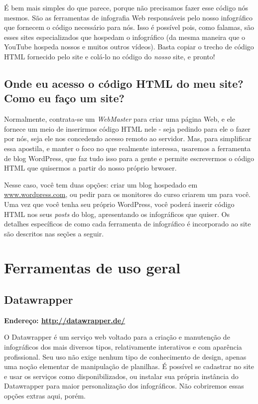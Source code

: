 \documentclass[12pt,onecolumn]{article}
\begin{document}
    É bem mais simples do que parece, porque não precisamos fazer esse código
    nós mesmos. São as ferramentas de infografia Web responsáveis pelo nosso
    infográfico que fornecem o código necessário para nós. Isso é possível pois,
    como falamas, são esses sites especializados que hospedam o infográfico (da
    mesma maneira que o YouTube hospeda nossos e muitos outros vídeos). Basta
    copiar o trecho de código HTML fornecido pelo site e colá-lo no código do 
    \emph{nosso} site, e pronto!
    
  \subsection{Onde eu acesso o código HTML do meu site? Como eu faço um site?}
    Normalmente, contrata-se um \textit{WebMaster} para criar uma página Web, e
    ele fornece um meio de inserirmos código HTML nele - seja pedindo para ele o
    fazer por nós, seja ele nos concedendo acesso remoto ao servidor. Mas, para
    simplificar essa apostila, e manter o foco no que realmente interessa,
    usaremos a ferramenta de blog WordPress, que faz tudo isso para a gente e
    permite escrevermos o código HTML que quisermos a partir do nosso próprio
    brwoser.
    
    Nesse caso, você tem duas opções: criar um blog hospedado em
    \url{www.wordpress.com}, ou pedir para os monitores do curso criarem um
    para você\footnotemark. Uma vez que você tenha seu próprio WordPress, você
    poderá inserir código HTML nos seus \textit{posts} do blog, apresentando os
    infográficos que quiser. Os detalhes específicos de como cada ferramenta de
    infográfico é incorporado ao site são descritos nas seções a seguir.
    

\clearpage
\section{Ferramentas de uso geral}
  \subsection{Datawrapper}
     \textbf{Endereço: \url{http://datawrapper.de/}}
    
    O Datawrapper é um serviço web voltado para a criação e manutenção de
    infográficos dos mais diversos tipos, relativamente interativos e com
    aparência profissional. Seu uso não exige nenhum tipo de conhecimento de
    design, apenas uma noção elementar de manipulação de planilhas. É possível
    se cadastrar no site e usar os serviços como disponibilizados, ou instalar
    sua própria instância do Datawrapper para maior personalização dos
    infográficos. Não cobriremos essas opções extras aqui, porém.
    
\end{document}
